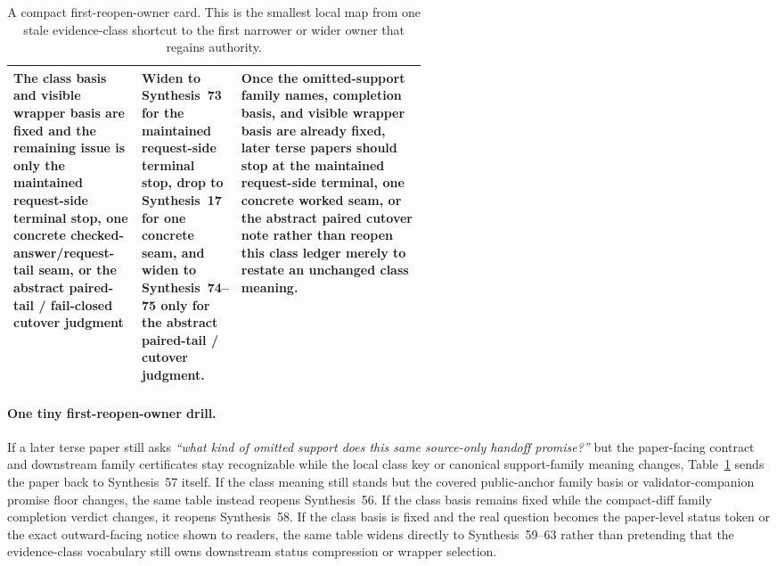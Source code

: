 \documentclass[11pt]{article}
\begin{document}
\begin{table}[t]
\begin{tabularx}{\linewidth}{@{}p{0.31\linewidth}p{0.23\linewidth}X@{}}
The class basis and visible wrapper basis are fixed and the remaining issue is only the maintained request-side terminal stop, one concrete checked-answer/request-tail seam, or the abstract paired-tail / fail-closed cutover judgment & Widen to Synthesis~73 for the maintained request-side terminal stop, drop to Synthesis~17 for one concrete seam, and widen to Synthesis~74--75 only for the abstract paired-tail / cutover judgment. & Once the omitted-support family names, completion basis, and visible wrapper basis are already fixed, later terse papers should stop at the maintained request-side terminal, one concrete worked seam, or the abstract paired cutover note rather than reopen this class ledger merely to restate an unchanged class meaning. \\
\bottomrule
\end{tabularx}
\caption{A compact first-reopen-owner card. This is the smallest local map from one stale evidence-class shortcut to the first narrower or wider owner that regains authority.}
\label{tab:first-reopen-owner-card-requestable-evidence-class}
\end{table}

\paragraph{One tiny first-reopen-owner drill.}
If a later terse paper still asks \emph{``what kind of omitted support does this same source-only handoff promise?''} but the paper-facing contract and downstream family certificates stay recognizable while the local class key or canonical support-family meaning changes, Table~\ref{tab:first-reopen-owner-card-requestable-evidence-class} sends the paper back to Synthesis~57 itself. If the class meaning still stands but the covered public-anchor family basis or validator-companion promise floor changes, the same table instead reopens Synthesis~56. If the class basis remains fixed while the compact-diff family completion verdict changes, it reopens Synthesis~58. If the class basis is fixed and the real question becomes the paper-level status token or the exact outward-facing notice shown to readers, the same table widens directly to Synthesis~59--63 rather than pretending that the evidence-class vocabulary still owns downstream status compression or wrapper selection.\cite{series:workedexample,series:publicrequeststatusenvelopes,series:publicrequestcarryforward,series:publicrequestnotices,series:publicrequestnoticenormalforms,series:publicrequestnoticeselections,series:requestsideterminalcitationnormalform,series:pairedterminalcitationdiscipline,series:pairedterminalcutoverrules}
\end{document}

